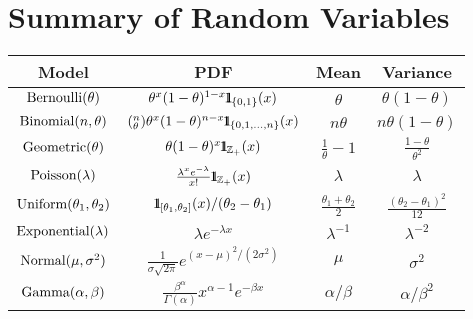 

\section*{Summary of Random Variables}\label{S:SummaryRVs}
\begin{table}[ht]
\centering
\begin{tabular}{|c|c|c|c|}%
\hline
Model &PDF&Mean&Variance\\ \hline%
$\mbox{{\rm Bernoulli}}(\theta)$ &$\theta^x(1-\theta)^{1-x} {1}\mspace{-11 mu}{1}_{\{0,1\}}(x)$&$\theta$&$\theta(1-\theta)$\\%
$\mbox{{\rm Binomial}}(n,\theta)$&$(^n_{\theta})\theta^x(1-\theta)^{n-x} {1}\mspace{-11 mu}{1}_{\{0,1,\ldots,n\}}(x)$&$n \theta$&$n \theta(1-\theta)$\\%
$\mbox{{\rm Geometric}}(\theta)$ &$\theta(1-\theta)^{x} {1}\mspace{-11 mu}{1}_{\mathbb{Z}_+}(x)$&$ \frac{1}{\theta}-1$&$\frac{1-\theta}{\theta^2}$\\%
$\mbox{{\rm Poisson}}(\lambda)$&$\frac{\lambda^xe^{-\lambda}}{x!} {1}\mspace{-11 mu}{1}_{\mathbb{Z}_+}(x)$&$\lambda$&$\lambda$\\%
$\mbox{{\rm Uniform}}(\theta_1,\theta_2)$&${1}\mspace{-11 mu}{1}_{[\theta_1,\theta_2]}(x)/(\theta_2-\theta_1)$&$\frac{\theta_1+\theta_2}{2}$&$\frac{(\theta_2-\theta_1)^2}{12}$\\%
$\mbox{{\rm Exponential}}(\lambda)$&$\lambda e^{-\lambda x}$&$\lambda^{-1}$&$\lambda^{-2}$\\%
$\mbox{{\rm Normal}}(\mu,\sigma^2)$&$\frac{1}{\sigma\sqrt{2\pi}}e^{(x-\mu)^2/(2\sigma^2)}$&$\mu$&$\sigma^2$\\%
$\mbox{{\rm Gamma}}(\alpha,\beta)$&$\frac{\beta^{\alpha}}{\Gamma(\alpha)}{x^{\alpha-1}e^{-\beta x}}$&$\alpha/\beta$&$\alpha/\beta^2$\\%

\end{tabular}
\end{table}
